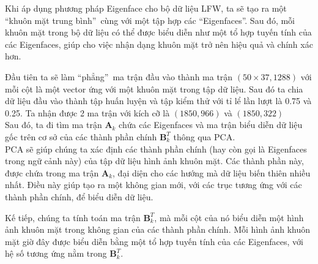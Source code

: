 \documentclass[12pt,a4paper,oneside]{report}
\numberwithin{equation}{section}
\begin{document}
Khi áp dụng phương pháp Eigenface cho bộ dữ liệu LFW, ta sẽ tạo ra một \textquotedblleft khuôn mặt trung bình\textquotedblright\ cùng với một tập hợp các \textquotedblleft Eigenfaces\textquotedblright. Sau đó, mỗi khuôn mặt trong bộ dữ liệu có thể được biểu diễn như một tổ hợp tuyến tính của các Eigenfaces, giúp cho việc nhận dạng khuôn mặt trở nên hiệu quả và chính xác hơn.

Đầu tiên ta sẽ làm \textquotedblleft phẳng\textquotedblright\ ma trận đầu vào thành ma trận $(50\times37,1288)$ với mỗi cột là một vector ứng với một khuôn mặt trong tập dữ liệu. Sau đó ta chia dữ liệu đầu vào thành tập huấn luyện và tập kiểm thử với tỉ lể lần lượt là 0.75 và 0.25. Ta nhận được 2 ma trận với kích cỡ là $(1850,966)$ và $(1850,322)$\\
Sau đó, ta đi tìm ma trận $\mathbf{A}_k$ chứa các Eigenfaces và ma trận biểu diễn dữ liệu gốc trên cơ sở của các thành phần chính $\mathbf{B}_k^T$ thông qua PCA.\\
PCA sẽ giúp chúng ta xác định các thành phần chính (hay còn gọi là Eigenfaces trong ngữ cảnh này) của tập dữ liệu hình ảnh khuôn mặt. Các thành phần này, được chứa trong ma trận $\mathbf{A}_k$, đại diện cho các hướng mà dữ liệu biến thiên nhiều nhất. Điều này giúp tạo ra một không gian mới, với các trục tương ứng với các thành phần chính, để biểu diễn dữ liệu.

Kế tiếp, chúng ta tính toán ma trận $\mathbf{B}_k^T$, mà mỗi cột của nó biểu diễn một hình ảnh khuôn mặt trong không gian của các thành phần chính. Mỗi hình ảnh khuôn mặt giờ đây được biểu diễn bằng một tổ hợp tuyến tính của các Eigenfaces, với hệ số tương ứng nằm trong $\mathbf{B}_k^T$.
\end{document}
